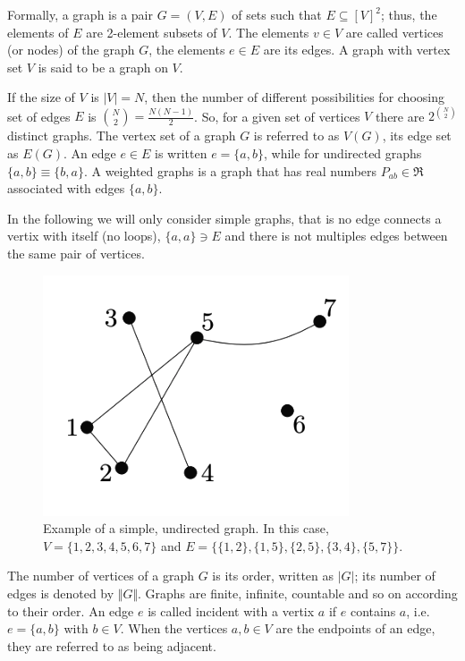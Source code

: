 \documentclass[10pt,a4paper]{book}
\numberwithin{equation}{chapter}
\numberwithin{figure}{chapter}
\numberwithin{table}{chapter}
\begin{document}
Formally, a graph \cite{Diestel} is a pair $G=(V,E)$ of sets such that $E\subseteq [V]^2$; thus, the elements of $E$ are 2-element subsets of $V$. The elements $v \in V$ are called vertices (or nodes) of the graph $G$, the elements $e \in E$ are its edges. A graph with vertex set $V$ is said to be a graph on $V$. 

If the size of $V$ is $|V|=N$, then the number of different possibilities for choosing set of edges $E$ is ${N \choose 2}=\frac{N(N-1)}{2}$. So, for a given set of vertices $V$ there are $2^{N \choose 2}$ distinct graphs. The vertex set of a graph $G$ is referred to as $V(G)$, its edge set as $E(G)$. An edge $e \in E$ is written  $e=\lbrace a,b \rbrace$, while for undirected graphs $\lbrace a,b \rbrace\equiv \lbrace b,a \rbrace$. A weighted graphs is a graph that has real numbers $P_{ab}\in \Re$ associated with edges $\lbrace a,b\rbrace$.

In the following we will only consider simple graphs, that is no edge connects a vertix with itself (no loops), $\lbrace a,a\rbrace\ni E$ and there is not multiples edges between the same pair of vertices.

\begin{figure}[H]
    \begin{center}
        \includegraphics[scale=0.5]{Imagen1.png}
    \end{center}
    \caption{\footnotesize Example of a simple, undirected graph. In this case, $V=\lbrace 1,2,3,4,5,6,7 \rbrace$ and $E=\lbrace \lbrace 1,2 \rbrace , \lbrace 1,5 \rbrace , \lbrace 2,5 \rbrace , \lbrace 3,4 \rbrace , \lbrace 5,7 \rbrace \rbrace$.}
    \label{fig1}
\end{figure}

The number of vertices of a graph $G$ is its order, written as $|G|$; its number of edges is denoted by $\Vert G \Vert$. Graphs are finite, infinite, countable and so on according to their order.
An edge $e$ is called incident with a vertix $a$ if $e$ contains $a$, i.e. $e=\lbrace a,b\rbrace$ with $b \in V$. When the vertices $a,b \in V$ are the endpoints of an edge, they are referred to as being adjacent.
\end{document}
